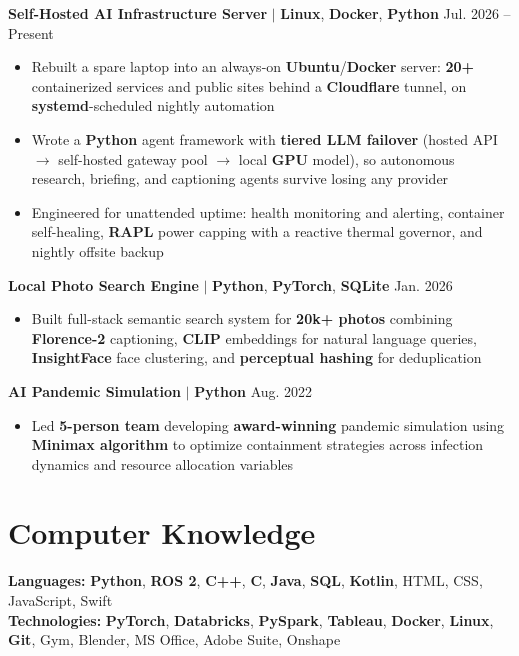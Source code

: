 \documentclass[11pt,letterpaper]{article}
\begin{document}
\textbf{Self-Hosted AI Infrastructure Server} $|$ \textbf{Linux}, \textbf{Docker}, \textbf{Python} \hfill Jul. 2026 -- Present
\begin{itemize}
    \item Rebuilt a spare laptop into an always-on \textbf{Ubuntu}/\textbf{Docker} server: \textbf{20+} containerized services and public sites behind a \textbf{Cloudflare} tunnel, on \textbf{systemd}-scheduled nightly automation
    \item Wrote a \textbf{Python} agent framework with \textbf{tiered LLM failover} (hosted API $\rightarrow$ self-hosted gateway pool $\rightarrow$ local \textbf{GPU} model), so autonomous research, briefing, and captioning agents survive losing any provider
    \item Engineered for unattended uptime: health monitoring and alerting, container self-healing, \textbf{RAPL} power capping with a reactive thermal governor, and nightly offsite backup
\end{itemize}

\textbf{Local Photo Search Engine} $|$ \textbf{Python}, \textbf{PyTorch}, \textbf{SQLite} \hfill Jan. 2026
\begin{itemize}
    \item Built full-stack semantic search system for \textbf{20k+ photos} combining \textbf{Florence-2} captioning, \textbf{CLIP} embeddings for natural language queries, \textbf{InsightFace} face clustering, and \textbf{perceptual hashing} for deduplication
\end{itemize}

\textbf{AI Pandemic Simulation} $|$ \textbf{Python} \hfill Aug. 2022
\begin{itemize}
    \item Led \textbf{5-person team} developing \textbf{award-winning} pandemic simulation using \textbf{Minimax algorithm} to optimize containment strategies across infection dynamics and resource allocation variables
\end{itemize}

\section{Computer Knowledge}

\textbf{Languages:} \textbf{Python}, \textbf{ROS 2}, \textbf{C++}, \textbf{C}, \textbf{Java}, \textbf{SQL}, \textbf{Kotlin}, HTML, CSS, JavaScript, Swift\\
\textbf{Technologies:} \textbf{PyTorch}, \textbf{Databricks}, \textbf{PySpark}, \textbf{Tableau}, \textbf{Docker}, \textbf{Linux}, \textbf{Git}, Gym, Blender, MS Office, Adobe Suite, Onshape
\end{document}
